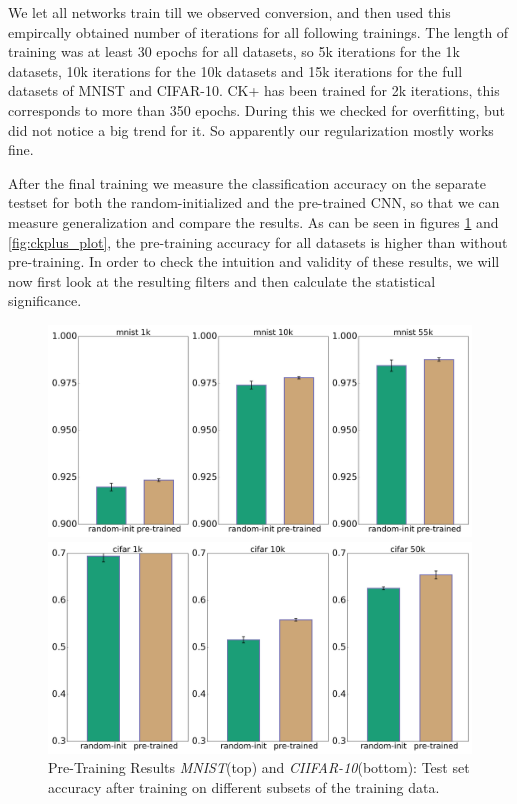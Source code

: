 \documentclass{article}
\begin{document}
    We let all networks train till we observed conversion, and then used this empircally obtained number of iterations for all following trainings.
    The length of training was at least 30 epochs for all datasets, so 5k iterations for the 1k datasets, 10k iterations for the 10k datasets and 15k iterations for the full datasets of MNIST and CIFAR-10.
    CK+ has been trained for 2k iterations, this corresponds to more than 350 epochs.
    During this we checked for overfitting, but did not notice a big trend for it.
    So apparently our regularization mostly works fine.

    After the final training we measure the classification accuracy on the separate testset for both the random-initialized and the pre-trained CNN, so that we can measure generalization and compare the results.
    As can be seen in figures \ref{fig:mnist_cifar_plot} and \ref{fig:ckplus_plot}, the pre-training accuracy for all datasets is higher than without pre-training.
    In order to check the intuition and validity of these results, we will now first look at the resulting filters and then calculate the statistical significance.
    \begin{figure}
      \centering

      \includegraphics[width=.8\linewidth]{../box_plots/boxplots_mnist.png}

      \includegraphics[width=.8\linewidth]{../box_plots/boxplots_cifar.png}

      \caption{Pre-Training Results \emph{MNIST}(top) and \emph{CIIFAR-10}(bottom): Test set accuracy after training on different subsets of the training data.}
      \label{fig:mnist_cifar_plot}
    \end{figure}
\end{document}
